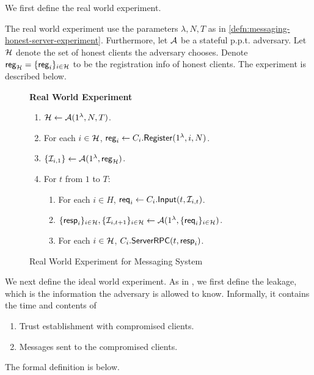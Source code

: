 We first define the real world experiment.

\begin{definition}
\label{defn:messaging-real-world-experiment}
The real world experiment use the parameters $\lambda, N, T$ as in \cref{defn:messaging-honest-server-experiment}. Furthermore, let $\mathcal{A}$ be a stateful p.p.t. adversary. Let $\mathcal{H}$ denote the set of honest clients the adversary chooses. Denote $\mathsf{reg}_{\mathcal{H}} = \{\mathsf{reg}_i\}_{i \in\mathcal{H}}$ to be the registration info of honest clients. The experiment is described below.
\end{definition}

\begin{figure}[!ht]
\begin{framed}
\textbf{Real World Experiment}
\begin{enumerate}
\item $\mathcal{H} \leftarrow \mathcal{A}(1^{\lambda}, N, T)$.
\item For each $i \in \mathcal{H}$, $\mathsf{reg}_i \leftarrow C_i.\mathsf{Register}(1^{\lambda}, i, N)$. 
\item $\{\mathcal{I}_{i, 1}\} \leftarrow \mathcal{A}(1^{\lambda}, \mathsf{reg}_{\mathcal{H}})$.
\item For $t$ from $1$ to $T$:
    \begin{enumerate}
    \item For each $i \in H$, $\mathsf{req}_i \leftarrow C_i.\mathsf{Input}(t, \mathcal{I}_{i, t})$.
    
    \item $\{\mathsf{resp}_i\}_{i \in \mathcal{H}}, \{\mathcal{I}_{i, t + 1}\}_{i \in \mathcal{H}} \leftarrow \mathcal{A}(1^{\lambda}, \{\mathsf{req}_i\}_{i \in \mathcal{H}})$.
    
    \item For each $i \in \mathcal{H}$, $C_i.\mathsf{ServerRPC}(t, \mathsf{resp}_i)$.
    \end{enumerate}
\end{enumerate}
\end{framed}
\caption{Real World Experiment for Messaging System}
\label{expr:messaging-real-world}
\end{figure}

We next define the ideal world experiment. As in \cite{shi2021non}, we first define the leakage, which is the information the adversary is allowed to know. Informally, it contains the time and contents of
\begin{enumerate}
    \item Trust establishment with compromised clients.
    \item Messages sent to the compromised clients.
\end{enumerate}
The formal definition is below.

